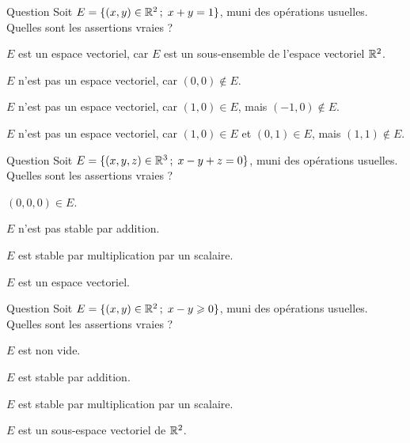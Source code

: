 

\begin{multi}[multiple,feedback=
{\(E\) n'est pas un sous-espace vectoriel de \(\Rr^2\), puisque \((0,0) \notin E\).\\
\(E\) n'est pas stable par multiplication par un scalaire : \((1,0) \in E\) , mais,  \(-(1,0)=(-1,0) \notin E\).\\
\(E\) n'est pas stable par addition : \((1,0)  \in E \) et \((0,1)  \in E \), mais \((1,0)+(0,1)=(1,1) \notin E\).
}]{Question}
Soit \(E=\{(x,y)\in \mathbb{R}^2 \, ; \;  x+y=1\}\), muni des opérations usuelles. Quelles sont les assertions vraies ?

    \item \(E\) est un espace vectoriel, car  \(E\) est un sous-ensemble de l'espace vectoriel \(\Rr^2\).
    \item* \(E\) n'est pas un espace vectoriel, car \((0,0)\notin E\).
    \item* \(E\) n'est pas un espace vectoriel, car \((1,0)\in E\), mais \((-1,0)\notin E\).
    \item* \(E\) n'est pas un espace vectoriel, car \((1,0)\in E\) et \((0,1)\in E\), mais \((1,1)\notin E\).
\end{multi}


\begin{multi}[multiple,feedback=
{\(E\) est un sous-espace vectoriel de \(\Rr^3\), puisque \((0,0,0) \in E\), \(E\) est stable par addition 
et multiplication par un scalaire.
}]{Question}
Soit \(E=\{(x,y,z) \in \mathbb{R}^3 \,  ; \; x-y+z=0\}\), muni des opérations usuelles. Quelles sont les assertions vraies ?

    \item* \((0,0,0)\in E\).
    \item \(E\) n'est pas stable par addition.
    \item* \(E\) est stable par multiplication par un scalaire.
    \item* \(E\) est un espace vectoriel.
\end{multi}


\begin{multi}[multiple,feedback=
{\(E\) n'est pas un sous-espace vectoriel de \(\Rr^2\), puisque \(E\) n'est pas stable par multiplication par un scalaire : 
\((1,0) \in E\), mais,  \(-(1,0)=(-1,0) \notin E \). Cependant, \(E\) est stable par addition.
}]{Question}
Soit \(E=\{(x,y)\in \mathbb{R}^2  \, ; \; x-y\geqslant 0\}\), muni des opérations usuelles. Quelles sont les assertions vraies ?

    \item* \(E\) est non vide.
    \item* \(E\) est stable par addition.
    \item \(E\) est stable par multiplication par un scalaire.
    \item \(E\) est un sous-espace vectoriel de \(\Rr^2\).
\end{multi}


